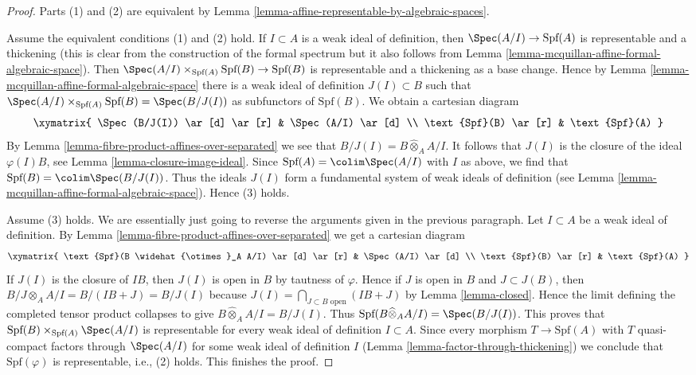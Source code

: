 \begin{proof}
Parts (1) and (2) are equivalent by
Lemma \ref{lemma-affine-representable-by-algebraic-spaces}.

\medskip\noindent
Assume the equivalent conditions (1) and (2) hold.
If $I \subset A$ is a weak ideal of definition, then
$\Spec(A/I) \to \text{Spf}(A)$ is representable and a thickening
(this is clear from the construction of the formal spectrum
but it also follows from
Lemma \ref{lemma-mcquillan-affine-formal-algebraic-space}).
Then $\Spec(A/I) \times_{\text{Spf}(A)} \text{Spf}(B) \to \text{Spf}(B)$
is representable and a thickening as a base change.
Hence by
Lemma \ref{lemma-mcquillan-affine-formal-algebraic-space}
there is a weak ideal of definition $J(I) \subset B$ such that
$\Spec(A/I) \times_{\text{Spf}(A)} \text{Spf}(B) = \Spec(B/J(I))$
as subfunctors of $\text{Spf}(B)$. We obtain a cartesian diagram
$$
\xymatrix{
\Spec(B/J(I)) \ar[d] \ar[r] & \Spec(A/I) \ar[d] \\
\text{Spf}(B) \ar[r] & \text{Spf}(A)
}
$$
By Lemma \ref{lemma-fibre-product-affines-over-separated}
we see that $B/J(I) = B \widehat{\otimes}_A A/I$.
It follows that $J(I)$ is the closure of the ideal $\varphi(I)B$, see
Lemma \ref{lemma-closure-image-ideal}.
Since $\text{Spf}(A) = \colim \Spec(A/I)$ with $I$ as above,
we find that $\text{Spf}(B) = \colim \Spec(B/J(I))$.
Thus the ideals $J(I)$ form a fundamental system of weak
ideals of definition (see
Lemma \ref{lemma-mcquillan-affine-formal-algebraic-space}).
Hence (3) holds.

\medskip\noindent
Assume (3) holds. We are essentially just going to reverse the
arguments given in the previous paragraph.
Let $I \subset A$ be a weak ideal of definition.
By Lemma \ref{lemma-fibre-product-affines-over-separated}
we get a cartesian diagram
$$
\xymatrix{
\text{Spf}(B \widehat{\otimes}_A A/I) \ar[d] \ar[r] & \Spec(A/I) \ar[d] \\
\text{Spf}(B) \ar[r] & \text{Spf}(A)
}
$$
If $J(I)$ is the closure of $IB$, then $J(I)$ is open in $B$
by tautness of $\varphi$. Hence if $J$ is open in $B$ and $J \subset J(B)$,
then $B/J \otimes_A A/I = B/(IB + J) = B/J(I)$ because
$J(I) = \bigcap_{J \subset B\text{ open}} (IB + J)$ by Lemma \ref{lemma-closed}.
Hence the limit defining the completed tensor product collapses to give
$B \widehat{\otimes}_A A/I = B/J(I)$.
Thus $\text{Spf}(B \widehat{\otimes}_A A/I) = \Spec(B/J(I))$.
This proves that $\text{Spf}(B) \times_{\text{Spf}(A)} \Spec(A/I)$
is representable for every weak ideal of definition $I \subset A$.
Since every morphism $T \to \text{Spf}(A)$ with $T$ quasi-compact
factors through $\Spec(A/I)$ for some weak ideal of definition $I$
(Lemma \ref{lemma-factor-through-thickening})
we conclude that $\text{Spf}(\varphi)$ is representable, i.e.,
(2) holds. This finishes the proof.
\end{proof}

